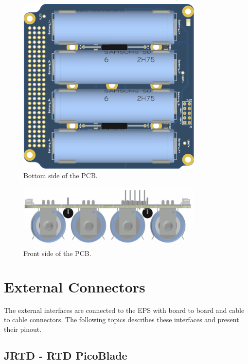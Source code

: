 \begin{figure}[!ht]
    \begin{center}
        \includegraphics[width=93mm]{figures/bat4c-pcb-bottom.png}
        \caption{Bottom side of the PCB.}
        \label{fig:pcb-bottom}
    \end{center}
\end{figure}

\begin{figure}[!ht]
    \begin{center}
        \includegraphics[width=93mm]{figures/bat4c-pcb-front.png}
        \caption{Front side of the PCB.}
        \label{fig:pcb-front}
    \end{center}
\end{figure}


\section{External Connectors}

The external interfaces are connected to the EPS with board to board and cable to cable connectors. The following topics describes these interfaces and present their pinout.

\subsection{JRTD - RTD PicoBlade}

